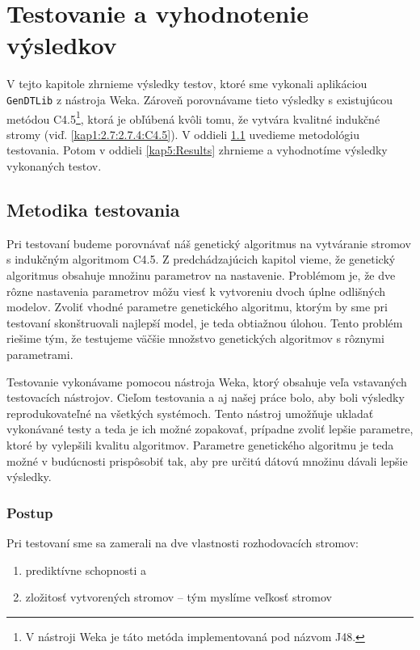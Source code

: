 \chapter{Testovanie a vyhodnotenie výsledkov}\label{kap5:Tests}
V tejto kapitole zhrnieme výsledky testov, ktoré sme vykonali aplikáciou \verb|GenDTLib| z nástroja Weka. Zároveň porovnávame tieto výsledky s existujúcou metódou C4.5\footnote{V nástroji Weka je táto metóda implementovaná pod názvom J48.}, ktorá je obľúbená kvôli tomu, že vytvára kvalitné indukčné stromy (viď. \ref{kap1:2.7:2.7.4:C4.5}). V oddieli \ref{kap5:Methodology} uvedieme metodológiu testovania. Potom v oddieli \ref{kap5:Results} zhrnieme a vyhodnotíme výsledky vykonaných testov.
\section{Metodika testovania}\label{kap5:Methodology}
Pri testovaní budeme porovnávať náš genetický algoritmus na vytváranie stromov s indukčným algoritmom C4.5. Z predchádzajúcich kapitol vieme, že genetický algoritmus obsahuje množinu parametrov na nastavenie. Problémom je, že dve rôzne nastavenia parametrov môžu viesť k vytvoreniu dvoch úplne odlišných modelov.
Zvoliť vhodné parametre genetického algoritmu, ktorým by sme pri testovaní skonštruovali najlepší model, je teda obtiažnou úlohou. Tento problém riešime tým, že testujeme väčšie množstvo genetických algoritmov s rôznymi parametrami.

Testovanie vykonávame pomocou nástroja Weka, ktorý obsahuje veľa vstavaných testovacích nástrojov. Cieľom testovania a aj našej práce bolo, aby boli výsledky reprodukovateľné na všetkých systémoch. Tento nástroj umožňuje ukladať vykonávané testy a teda je ich možné zopakovať, prípadne zvoliť lepšie parametre, ktoré by vylepšili kvalitu algoritmov. Parametre genetického algoritmu je teda možné v budúcnosti prispôsobiť tak, aby pre určitú dátovú množinu dávali lepšie výsledky.

\subsection{Postup}
Pri testovaní sme sa zamerali na dve vlastnosti rozhodovacích stromov:
\begin{enumerate}
\item prediktívne schopnosti a
\item zložitosť vytvorených stromov -- tým myslíme veľkosť stromov
\end{enumerate}

